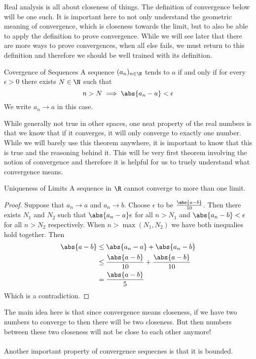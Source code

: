 Real analysis is all about closeness of things. The definition of convergence below will be one such. It is important here to not only understand the geometric meaning of convergence, which is closeness towards the limit, but to also be able to apply the definition to prove convergence. While we will see later that there are more ways to prove convergences, when all else fails, we must return to this definition and therefore we should be well trained with its definition. 

\begin{defn}{Covergence of Sequences}{} A sequence $(a_n)_{n\in\N}$ tends to $a$ if and only if for every $\epsilon>0$ there exists $N\in\N$ such that $$n>N\implies \abs{a_n-a}<\epsilon$$
We write $a_n\to a$ in this case. 
\end{defn}

While generally not true in other spaces, one neat property of the real numbers is that we know that if it converges, it will only converge to exactly one number. While we will barely use this theorem anywhere, it is important to know that this is true and the reasoning behind it. This will be very first theorem involving the notion of convergence and therefore it is helpful for us to truely understand what convergence means. 

\begin{thm}{Uniqueness of Limits}{} A sequence in $\R$ cannot converge to more than one limit. \tcbline
\begin{proof} Suppose that $a_n\to a$ and $a_n\to b$. Choose $\epsilon$ to be $\frac{\abs{a-b}}{10}$. Then there exists $N_1$ and $N_2$ such that $\abs{a_n-a}\epsilon$ for all $n>N_1$ and $\abs{a_n-b}<\epsilon$ for all $n>N_2$ respectively. When $n>\max{(N_1,N_2)}$ we have both inequalies hold together. Then 
\begin{align*}
\abs{a-b}&\leq\abs{a_n-a}+\abs{a_n-b}\\
&\leq \frac{\abs{a-b}}{10}+\frac{\abs{a-b}}{10}\\
&=\frac{\abs{a-b}}{5}
\end{align*}
Which is a contradiction. 
\end{proof}
\end{thm}

The main idea here is that since convergence means closeness, if we have two numbers to converge to then there will be two closeness. But then numbers between these two closeness will not be close to each other anymore! \\~\\
Another important property of convergence sequecnes is that it is bounded. 

